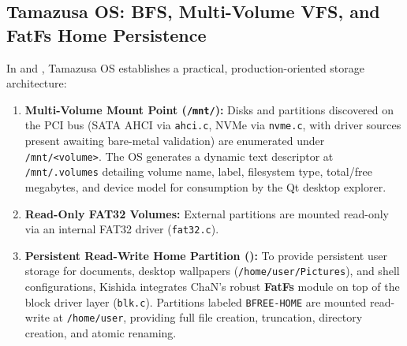 \documentclass[10pt,journal,compsoc,twocolumn]{article}
\begin{document}
\subsection{Tamazusa OS: BFS, Multi-Volume VFS, and FatFs Home Persistence}
In  and , Tamazusa OS establishes a practical, production-oriented storage architecture:
\begin{enumerate}[leftmargin=*]
    \item \textbf{Multi-Volume Mount Point (\texttt{/mnt/}):} Disks and partitions discovered on the PCI bus (SATA AHCI via \texttt{ahci.c}, NVMe via \texttt{nvme.c}, with driver sources present awaiting bare-metal validation) are enumerated under \texttt{/mnt/<volume>}. The OS generates a dynamic text descriptor at \texttt{/mnt/.volumes} detailing volume name, label, filesystem type, total/free megabytes, and device model for consumption by the Qt desktop explorer.
    \item \textbf{Read-Only FAT32 Volumes:} External partitions are mounted read-only via an internal FAT32 driver (\texttt{fat32.c}).
    \item \textbf{Persistent Read-Write Home Partition ():} To provide persistent user storage for documents, desktop wallpapers (\texttt{/home/user/Pictures}), and shell configurations, Kishida integrates ChaN's robust \textbf{FatFs} module on top of the block driver layer (\texttt{blk.c}). Partitions labeled \texttt{BFREE-HOME} are mounted read-write at \texttt{/home/user}, providing full file creation, truncation, directory creation, and atomic renaming.
\end{enumerate}
\end{document}

